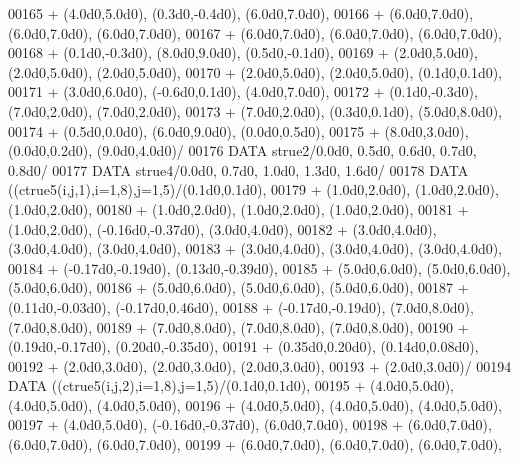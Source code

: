 \begin{DoxyCode}
00165      +                  (4.0d0,5.0d0), (0.3d0,-0.4d0), (6.0d0,7.0d0),
00166      +                  (6.0d0,7.0d0), (6.0d0,7.0d0), (6.0d0,7.0d0),
00167      +                  (6.0d0,7.0d0), (6.0d0,7.0d0), (6.0d0,7.0d0),
00168      +                  (0.1d0,-0.3d0), (8.0d0,9.0d0), (0.5d0,-0.1d0),
00169      +                  (2.0d0,5.0d0), (2.0d0,5.0d0), (2.0d0,5.0d0),
00170      +                  (2.0d0,5.0d0), (2.0d0,5.0d0), (0.1d0,0.1d0),
00171      +                  (3.0d0,6.0d0), (-0.6d0,0.1d0), (4.0d0,7.0d0),
00172      +                  (0.1d0,-0.3d0), (7.0d0,2.0d0), (7.0d0,2.0d0),
00173      +                  (7.0d0,2.0d0), (0.3d0,0.1d0), (5.0d0,8.0d0),
00174      +                  (0.5d0,0.0d0), (6.0d0,9.0d0), (0.0d0,0.5d0),
00175      +                  (8.0d0,3.0d0), (0.0d0,0.2d0), (9.0d0,4.0d0)/
00176       \textcolor{keyword}{DATA}              strue2/0.0d0, 0.5d0, 0.6d0, 0.7d0, 0.8d0/
00177       \textcolor{keyword}{DATA}              strue4/0.0d0, 0.7d0, 1.0d0, 1.3d0, 1.6d0/
00178       \textcolor{keyword}{DATA}              ((ctrue5(i,j,1),i=1,8),j=1,5)/(0.1d0,0.1d0),
00179      +                  (1.0d0,2.0d0), (1.0d0,2.0d0), (1.0d0,2.0d0),
00180      +                  (1.0d0,2.0d0), (1.0d0,2.0d0), (1.0d0,2.0d0),
00181      +                  (1.0d0,2.0d0), (-0.16d0,-0.37d0), (3.0d0,4.0d0),
00182      +                  (3.0d0,4.0d0), (3.0d0,4.0d0), (3.0d0,4.0d0),
00183      +                  (3.0d0,4.0d0), (3.0d0,4.0d0), (3.0d0,4.0d0),
00184      +                  (-0.17d0,-0.19d0), (0.13d0,-0.39d0),
00185      +                  (5.0d0,6.0d0), (5.0d0,6.0d0), (5.0d0,6.0d0),
00186      +                  (5.0d0,6.0d0), (5.0d0,6.0d0), (5.0d0,6.0d0),
00187      +                  (0.11d0,-0.03d0), (-0.17d0,0.46d0),
00188      +                  (-0.17d0,-0.19d0), (7.0d0,8.0d0), (7.0d0,8.0d0),
00189      +                  (7.0d0,8.0d0), (7.0d0,8.0d0), (7.0d0,8.0d0),
00190      +                  (0.19d0,-0.17d0), (0.20d0,-0.35d0),
00191      +                  (0.35d0,0.20d0), (0.14d0,0.08d0),
00192      +                  (2.0d0,3.0d0), (2.0d0,3.0d0), (2.0d0,3.0d0),
00193      +                  (2.0d0,3.0d0)/
00194       \textcolor{keyword}{DATA}              ((ctrue5(i,j,2),i=1,8),j=1,5)/(0.1d0,0.1d0),
00195      +                  (4.0d0,5.0d0), (4.0d0,5.0d0), (4.0d0,5.0d0),
00196      +                  (4.0d0,5.0d0), (4.0d0,5.0d0), (4.0d0,5.0d0),
00197      +                  (4.0d0,5.0d0), (-0.16d0,-0.37d0), (6.0d0,7.0d0),
00198      +                  (6.0d0,7.0d0), (6.0d0,7.0d0), (6.0d0,7.0d0),
00199      +                  (6.0d0,7.0d0), (6.0d0,7.0d0), (6.0d0,7.0d0),

\end{DoxyCode}
